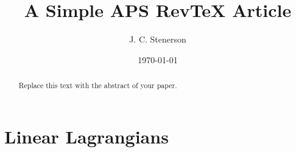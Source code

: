 

\newtheorem{theorem}{Theorem}
\newtheorem{acknowledgement}[theorem]{Acknowledgement}
\newtheorem{algorithm}[theorem]{Algorithm}
\newtheorem{axiom}[theorem]{Axiom}
\newtheorem{claim}[theorem]{Claim}
\newtheorem{conclusion}[theorem]{Conclusion}
\newtheorem{condition}[theorem]{Condition}
\newtheorem{conjecture}[theorem]{Conjecture}
\newtheorem{corollary}[theorem]{Corollary}
\newtheorem{criterion}[theorem]{Criterion}
\newtheorem{definition}[theorem]{Definition}
\newtheorem{example}[theorem]{Example}
\newtheorem{exercise}[theorem]{Exercise}
\newtheorem{lemma}[theorem]{Lemma}
\newtheorem{notation}[theorem]{Notation}
\newtheorem{problem}[theorem]{Problem}
\newtheorem{proposition}[theorem]{Proposition}
\newtheorem{remark}[theorem]{Remark}
\newtheorem{solution}[theorem]{Solution}
\newtheorem{summary}[theorem]{Summary}


\title{A Simple APS RevTeX Article}
\author{J. C. Stenerson}
\address{600 Ericksen Avenue NE, Suite 300, Bainbridge Island, WA 98110}
\date{\today}
\maketitle
{}

\begin{abstract}
Replace this text with the abstract of your paper.
\end{abstract}

\section{Linear Lagrangians}

